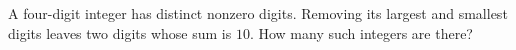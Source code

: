 A four-digit integer has distinct nonzero digits. Removing its largest and smallest digits leaves two digits whose sum is $10$. How many such integers are there?
